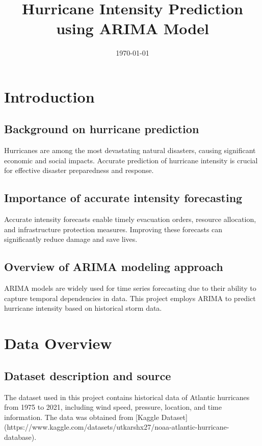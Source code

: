 \documentclass{article}
\title{Hurricane Intensity Prediction using ARIMA Model}
\date{\today}
\begin{document}
	
	\maketitle
	
	\tableofcontents
	
	\section{Introduction}
	\subsection{Background on hurricane prediction}
	Hurricanes are among the most devastating natural disasters, causing significant economic and social impacts. Accurate prediction of hurricane intensity is crucial for effective disaster preparedness and response.
	
	\subsection{Importance of accurate intensity forecasting}
	Accurate intensity forecasts enable timely evacuation orders, resource allocation, and infrastructure protection measures. Improving these forecasts can significantly reduce damage and save lives.
	
	\subsection{Overview of ARIMA modeling approach}
	ARIMA models are widely used for time series forecasting due to their ability to capture temporal dependencies in data. This project employs ARIMA to predict hurricane intensity based on historical storm data.
	
	\section{Data Overview}
	\subsection{Dataset description and source}
	The dataset used in this project contains historical data of Atlantic hurricanes from 1975 to 2021, including wind speed, pressure, location, and time information. The data was obtained from [Kaggle Dataset](https://www.kaggle.com/datasets/utkarshx27/noaa-atlantic-hurricane-database).
	
\end{document}
